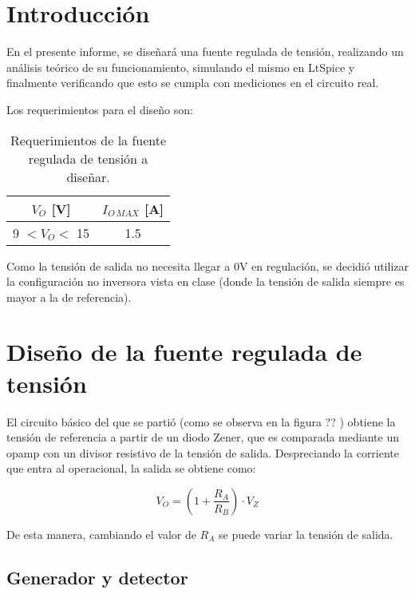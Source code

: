 \documentclass[e2_tp1_main.tex]{subfiles}
\begin{document}
\section{Introducci\'on}

En el presente informe, se dise\~nar\'a una fuente regulada de tensi\'on, realizando un an\'alisis te\'orico de su funcionamiento, simulando el mismo en LtSpice y finalmente verificando que esto se cumpla con mediciones en el circuito real. 

Los requerimientos para el dise\~no son:
\begin{table}[ht!]
	\centering
	
	\begin{tabular}{|c|c|}
		\hline 
		$V_{O}$ [V] & $I_{O\, MAX}$ [A] \\ 
		\hline \hline
		9 $< V_O <$ 15 & 1.5 \\ 
		\hline 
		\end{tabular} 	
	
	\caption{Requerimientos de la fuente regulada de tensi\'on a dise\~nar.}
	\label{table:reqs}
\end{table}

Como la tensi\'on de salida no necesita llegar a 0V en regulaci\'on, se decidi\'o utilizar la configuraci\'on no inversora vista en clase (donde la tensi\'on de salida siempre es mayor a la de referencia).


\section{Dise\~no de la fuente regulada de tensi\'on}

El circuito b\'asico del que se parti\'o (como se observa en la figura ?? ) obtiene la tensi\'on de referencia a partir de un diodo Zener, que es comparada mediante un opamp con un divisor resistivo de la tensi\'on de salida. Despreciando la corriente que entra al operacional, la salida se obtiene como:

\begin{equation}
	V_{O} = \left( 1+\frac{R_A}{R_B} \right) \cdot V_Z
\end{equation}

De esta manera, cambiando el valor de $R_A$ se puede variar la tensi\'on de salida. 


\subsection{Generador y detector}
\end{document}
